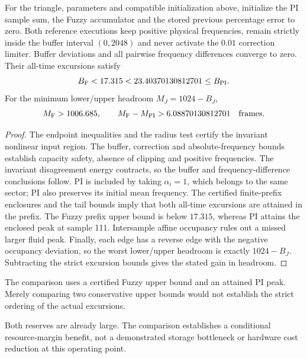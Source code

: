 \begin{btdtheorem}
\label{detail:thm:btd_headroom}
For the triangle, parameters and compatible initialization above,
initialize the PI sample sum, the Fuzzy accumulator and the stored
previous percentage error to zero. Both reference executions keep
positive physical frequencies, remain strictly inside the buffer
interval $(0,2048)$ and never activate the $0.01$ correction limiter.
Buffer deviations and all pairwise frequency differences converge to
zero. Their all-time excursions satisfy
\begin{equation}
 B_{\rm F}<17.315<23.40370130812701\le B_{\rm PI}.
 \label{detail:eq:btd_strict_comparison}
\end{equation}
For the minimum lower/upper headroom $M_J=1024-B_J$,
\begin{equation}
 M_{\rm F}>1006.685,\qquad
 M_{\rm F}-M_{\rm PI}>6.08870130812701\quad\text{frames}.
 \label{detail:eq:btd_margin_improvement}
\end{equation}
\end{btdtheorem}
\begin{proof}
The endpoint inequalities and the radius test certify the invariant
nonlinear input region. The buffer, correction and absolute-frequency
bounds establish capacity safety, absence of clipping and positive
frequencies. The invariant disagreement energy contracts, so the buffer
and frequency-difference conclusions follow. PI is included by taking
$\alpha_i=1$, which belongs to the same sector; PI also preserves its
initial mean frequency. The certified finite-prefix enclosures and the
tail bounds imply that both all-time excursions are attained in the
prefix. The Fuzzy prefix upper bound is below $17.315$, whereas PI
attains the enclosed peak at sample 111. Intersample affine occupancy
rules out a missed larger fluid peak. Finally, each edge has a reverse
edge with the negative occupancy deviation, so the worst lower/upper
headroom is exactly $1024-B_J$. Subtracting the strict excursion bounds
gives the stated gain in headroom.
\end{proof}

The comparison uses a certified Fuzzy upper bound and an attained PI
peak. Merely comparing two conservative upper bounds would not establish
the strict ordering of the actual excursions.

Both reserves are already large. The comparison establishes a conditional
resource-margin benefit, not a demonstrated storage bottleneck or hardware
cost reduction at this operating point.

